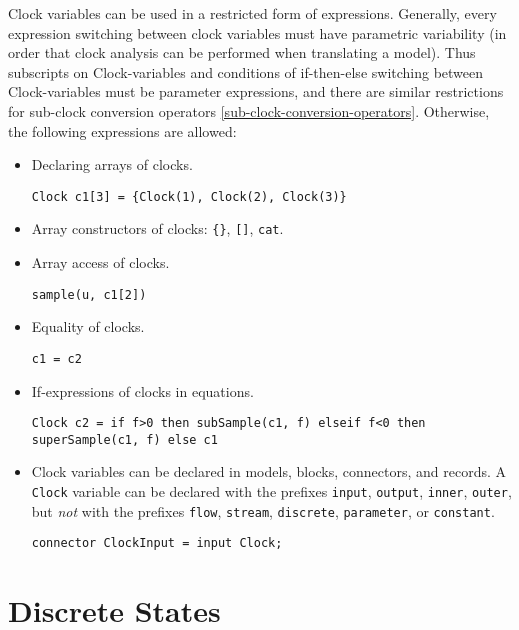 Clock variables can be used in a restricted form of expressions.
Generally, every expression switching between clock variables must have
parametric variability (in order that clock analysis can be
performed when translating a model).
Thus subscripts on Clock-variables and conditions of if-then-else switching between Clock-variables must
be parameter expressions, and there are similar restrictions for sub-clock conversion operators \cref{sub-clock-conversion-operators}.
Otherwise, the following expressions are allowed:
\begin{itemize}
\item
  Declaring arrays of clocks.
  \begin{example}
  \lstinline!Clock c1[3] = {Clock(1), Clock(2), Clock(3)}!
  \end{example}
\item
  Array constructors of clocks: \lstinline!{}!, \lstinline![]!, \lstinline!cat!.
\item
  Array access of clocks.
  \begin{example}
  \lstinline!sample(u, c1[2])!
  \end{example}
\item
  Equality of clocks.
  \begin{example}
  \lstinline!c1 = c2!
  \end{example}
\item
  If-expressions of clocks in equations.
  \begin{example}
  \lstinline!Clock c2 = if f>0 then subSample(c1, f) elseif f<0 then superSample(c1, f) else c1!
  \end{example}
\item
  Clock variables can be declared in models, blocks, connectors, and
  records. A \lstinline!Clock! variable can be declared with the prefixes
  \lstinline!input!, \lstinline!output!, \lstinline!inner!, \lstinline!outer!, but
  \emph{not} with the prefixes \lstinline!flow!, \lstinline!stream!,
  \lstinline!discrete!, \lstinline!parameter!, or \lstinline!constant!.
  \begin{example}
  \lstinline!connector ClockInput = input Clock;!
  \end{example}
\end{itemize}

\section{Discrete States}\label{discrete-states}

